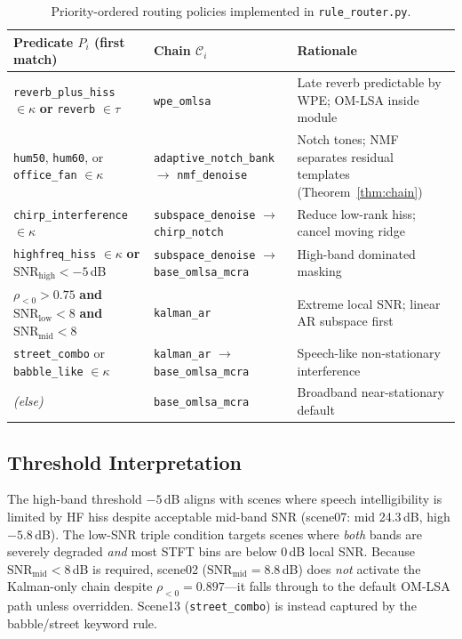 \begin{table}[H]
  \centering
  \caption{Priority-ordered routing policies implemented in \texttt{rule\_router.py}.}
  \label{tab:routing_rules}
  \small
  \begin{tabularx}{\textwidth}{l l X}
    \toprule
    \textbf{Predicate $P_i$ (first match)} & \textbf{Chain $\mathcal{C}_i$} & \textbf{Rationale} \\
    \midrule
    \texttt{reverb\_plus\_hiss} $\in\kappa$ \textbf{or} \texttt{reverb} $\in\tau$
      & \texttt{wpe\_omlsa}
      & Late reverb predictable by WPE; OM-LSA inside module \\
    \texttt{hum50}, \texttt{hum60}, or \texttt{office\_fan} $\in\kappa$
      & \texttt{adaptive\_notch\_bank} $\rightarrow$ \texttt{nmf\_denoise}
      & Notch tones; NMF separates residual templates (Theorem~\ref{thm:chain}) \\
    \texttt{chirp\_interference} $\in\kappa$
      & \texttt{subspace\_denoise} $\rightarrow$ \texttt{chirp\_notch}
      & Reduce low-rank hiss; cancel moving ridge \\
    \texttt{highfreq\_hiss} $\in\kappa$ \textbf{or} $\mathrm{SNR}_{\mathrm{high}} < -5$\,dB
      & \texttt{subspace\_denoise} $\rightarrow$ \texttt{base\_omlsa\_mcra}
      & High-band dominated masking \\
    $\rho_{<0}>0.75$ \textbf{and} $\mathrm{SNR}_{\mathrm{low}}<8$ \textbf{and} $\mathrm{SNR}_{\mathrm{mid}}<8$
      & \texttt{kalman\_ar}
      & Extreme local SNR; linear AR subspace first \\
    \texttt{street\_combo} or \texttt{babble\_like} $\in\kappa$
      & \texttt{kalman\_ar} $\rightarrow$ \texttt{base\_omlsa\_mcra}
      & Speech-like non-stationary interference \\
    \textit{(else)}
      & \texttt{base\_omlsa\_mcra}
      & Broadband near-stationary default \\
    \bottomrule
  \end{tabularx}
\end{table}

\subsection{Threshold Interpretation}

The high-band threshold $-5$\,dB aligns with scenes where speech intelligibility is limited by HF hiss despite acceptable mid-band SNR (scene07: mid 24.3\,dB, high $-5.8$\,dB). The low-SNR triple condition targets scenes where \emph{both} bands are severely degraded \emph{and} most STFT bins are below 0\,dB local SNR. Because $\mathrm{SNR}_{\mathrm{mid}}<8$\,dB is required, scene02 ($\mathrm{SNR}_{\mathrm{mid}}=8.8$\,dB) does \emph{not} activate the Kalman-only chain despite $\rho_{<0}=0.897$---it falls through to the default OM-LSA path unless overridden. Scene13 (\texttt{street\_combo}) is instead captured by the babble/street keyword rule.

